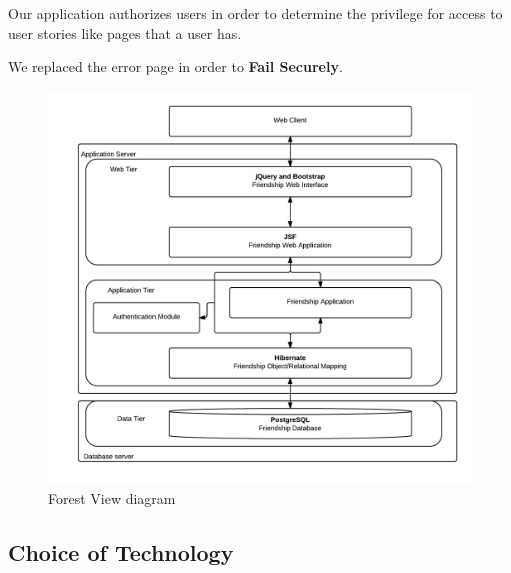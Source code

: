 \documentclass[a4paper]{article}
\begin{document}
Our application authorizes users in order to determine the privilege for access to user stories like pages that a user has.

We replaced the error page in order to \textbf{Fail Securely}.
\begin{figure}[h!]
\centering
\includegraphics[scale=0.3]{ForestView}
\caption{Forest View diagram}
\label{fig:forest_view}
\end{figure}




\subsection{Choice of Technology}
\end{document}

